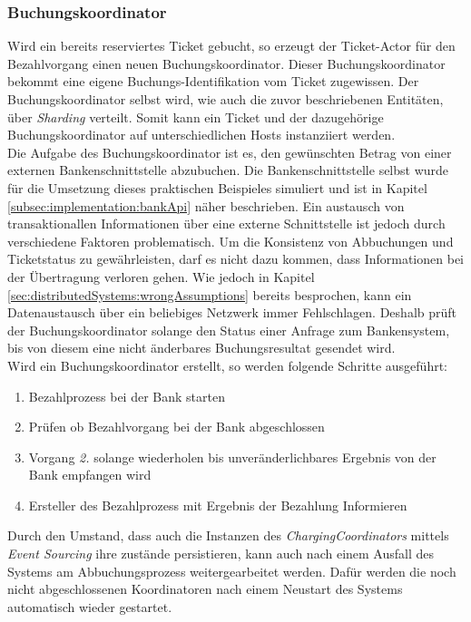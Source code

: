 \subsubsection{Buchungskoordinator}
\label{subsub:implementation:ChargingCoordinator}
Wird ein bereits reserviertes Ticket gebucht, so erzeugt der Ticket-Actor für den Bezahlvorgang einen neuen Buchungskoordinator. Dieser Buchungskoordinator bekommt eine eigene Buchungs-Identifikation vom Ticket zugewissen. Der Buchungskoordinator selbst wird, wie auch die zuvor beschriebenen Entitäten, über \textit{Sharding} verteilt. Somit kann ein Ticket und der dazugehörige Buchungskoordinator auf unterschiedlichen Hosts instanziiert werden. \\
Die Aufgabe des Buchungskoordinator ist es, den gewünschten Betrag von einer externen Bankenschnittstelle abzubuchen. Die Bankenschnittstelle selbst wurde für die Umsetzung dieses praktischen Beispieles simuliert und ist in Kapitel \ref{subsec:implementation:bankApi} näher beschrieben. Ein austausch von transaktionallen Informationen über eine externe Schnittstelle ist jedoch durch verschiedene Faktoren problematisch. Um die Konsistenz von Abbuchungen und Ticketstatus zu gewährleisten, darf es nicht dazu kommen, dass Informationen bei der Übertragung verloren gehen. Wie jedoch in Kapitel \ref{sec:distributedSystems:wrongAssumptions} bereits besprochen, kann ein Datenaustausch über ein beliebiges Netzwerk immer Fehlschlagen. Deshalb prüft der Buchungskoordinator solange den Status einer Anfrage zum Bankensystem, bis von diesem eine nicht änderbares Buchungsresultat gesendet wird. \\
Wird ein Buchungskoordinator erstellt, so werden folgende Schritte ausgeführt:
\begin{enumerate}
    \item Bezahlprozess bei der Bank starten
    \item Prüfen ob Bezahlvorgang bei der Bank abgeschlossen
    \item Vorgang \textit{2.} solange wiederholen bis unveränderlichbares Ergebnis von der Bank empfangen wird
    \item Ersteller des Bezahlprozess mit Ergebnis der Bezahlung Informieren
\end{enumerate}
Durch den Umstand, dass auch die Instanzen des \textit{ChargingCoordinators} mittels \textit{Event Sourcing} ihre zustände persistieren, kann auch nach einem Ausfall des Systems am Abbuchungsprozess weitergearbeitet werden. Dafür werden die noch nicht abgeschlossenen Koordinatoren nach einem Neustart des Systems automatisch wieder gestartet. \\
